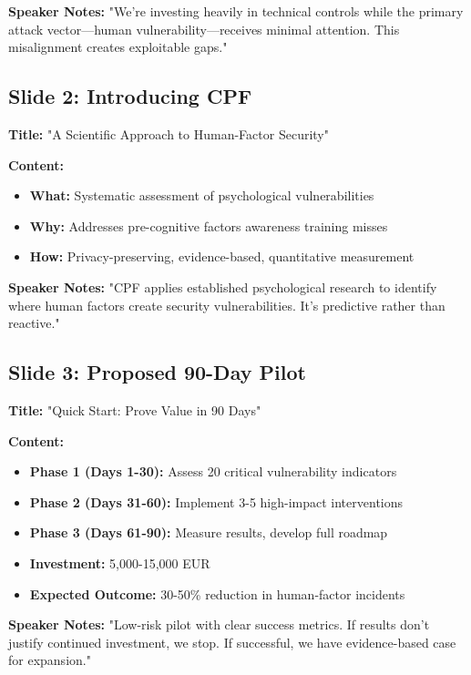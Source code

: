 \documentclass[11pt,a4paper]{article}
\begin{document}
\textbf{Speaker Notes:} "We're investing heavily in technical controls while the primary attack vector---human vulnerability---receives minimal attention. This misalignment creates exploitable gaps."

\subsection{Slide 2: Introducing CPF}

\textbf{Title:} "A Scientific Approach to Human-Factor Security"

\textbf{Content:}
\begin{itemize}
\item \textbf{What:} Systematic assessment of psychological vulnerabilities
\item \textbf{Why:} Addresses pre-cognitive factors awareness training misses
\item \textbf{How:} Privacy-preserving, evidence-based, quantitative measurement
\end{itemize}

\textbf{Speaker Notes:} "CPF applies established psychological research to identify where human factors create security vulnerabilities. It's predictive rather than reactive."

\subsection{Slide 3: Proposed 90-Day Pilot}

\textbf{Title:} "Quick Start: Prove Value in 90 Days"

\textbf{Content:}
\begin{itemize}
\item \textbf{Phase 1 (Days 1-30):} Assess 20 critical vulnerability indicators
\item \textbf{Phase 2 (Days 31-60):} Implement 3-5 high-impact interventions
\item \textbf{Phase 3 (Days 61-90):} Measure results, develop full roadmap
\item \textbf{Investment:} 5,000-15,000 EUR
\item \textbf{Expected Outcome:} 30-50\% reduction in human-factor incidents
\end{itemize}

\textbf{Speaker Notes:} "Low-risk pilot with clear success metrics. If results don't justify continued investment, we stop. If successful, we have evidence-based case for expansion."
\end{document}
